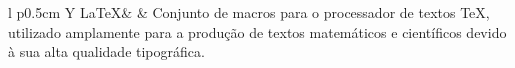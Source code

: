 \documentclass[10pt,twoside]{estiloUBI}
\begin{document}

\cleardoublepage


\newpage
\section*{}
\vspace{0.5cm}
	\noindent\begin{tabularx}{\linewidth}{l p{0.5cm} Y}
	\LaTeX & & Conjunto de macros para o processador de textos \TeX, utilizado amplamente para a produção de textos matemáticos e científicos devido à sua alta qualidade tipográfica.\cr
	\end{tabularx}
\cleardoublepage



\printindex
\end{document}
